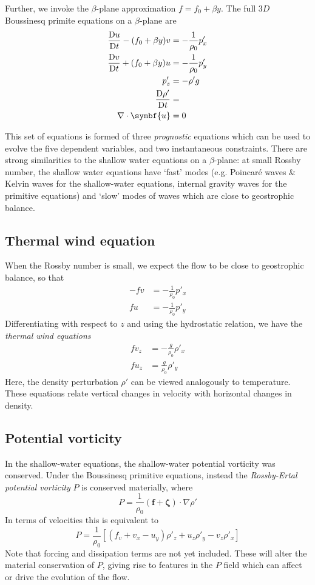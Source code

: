 \documentclass{jknotes}
\begin{document}
Further, we invoke the $\beta$-plane approximation $f = f_0 + \beta y$. The
full $3D$ Boussinesq primite equations on a $\beta$-plane are
\begin{align}
	\frac{\diffD u}{\diffD t} - (f_0+\beta y)v &= -\frac{1}{\rho_0} p'_x \\
	\frac{\diffD v}{\diffD t} + (f_0 + \beta y) u &= -\frac{1}{\rho_0} p'_y \\
	p'_z &= -\rho' g \\
	\frac{\diffD \rho'}{\diffD t} &= \\
	\nabla \cdot \symbf{u} &= 0
\end{align}

This set of equations is formed of three \emph{prognostic} equations which can
be used to evolve the five dependent variables, and two instantaneous
constraints. There are strong similarities to the shallow water equations on a
$\beta$-plane: at small Rossby number, the shallow water equations have
`fast' modes (e.g. Poincar\'{e} waves \& Kelvin waves for the shallow-water
equations, internal gravity waves for the primitive equations) and `slow'
modes of waves which are close to geostrophic balance.

\subsection{Thermal wind equation}
When the Rossby number is small, we expect the flow to be close to geostrophic
balance, so that
\begin{align}
	-fv &= -\frac{1}{\rho_0} p'_x \\
	fu &= -\frac{1}{\rho_0} p'_y
\end{align}
Differentiating with respect to $z$ and using the hydrostatic relation, we
have the \emph{thermal wind equations}
\begin{align}
	fv_z &= -\frac{g}{\rho_0} \rho'_x \\
	fu_z &= \frac{g}{\rho_0} \rho'_y
\end{align}
Here, the density perturbation $\rho'$ can be viewed analogously to
temperature. These equations relate vertical changes in velocity with
horizontal changes in density.

\subsection{Potential vorticity}
In the shallow-water equations, the shallow-water potential vorticity was
conserved. Under the Boussinesq primitive equations, instead the
\emph{Rossby-Ertal potential vorticity} $P$ is conserved materially, where
\begin{equation}
	P = \frac{1}{\rho_0} (\symbf{f} +\symbf{\zeta})\cdot \nabla \rho'
\end{equation}
In terms of velocities this is equivalent to
\begin{equation}
	P = \frac{1}{\rho_0} \left[ (f_v + v_x - u_y) \rho'_z + u_z \rho'_y -
		v_z
	\rho'_x\right]
\end{equation}
Note that forcing and dissipation terms are not yet included. These will alter
the material conservation of $P$, giving rise to features in the $P$ field
which can affect or drive the evolution of the flow.
\end{document}

